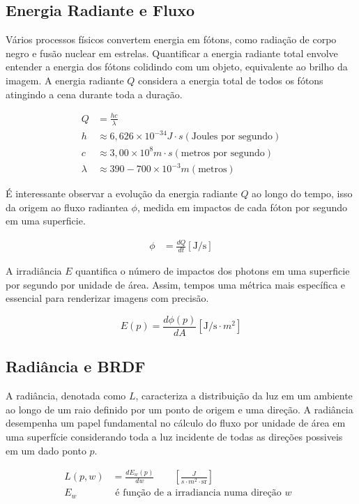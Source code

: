 \documentclass[english, 
               brazil, 
               bsc] %
               {dcomp-abntex2}
\begin{document}
\subsection{Energia Radiante e Fluxo}

Vários processos físicos convertem energia em fótons, como radiação de corpo negro e fusão nuclear em estrelas. Quantificar a energia radiante total envolve entender a energia dos fótons colidindo com um objeto, equivalente ao brilho da imagem. A energia radiante $Q$ considera a energia total de todos os fótons atingindo a cena durante toda a duração.

\begin{align*} 
Q &= \frac{hc}{\lambda} \\
  h &\approx 6,626 \times 10^{-34} J \cdot s (\text{Joules por segundo})\\
  c &\approx 3,00  \times 10^{8} m \cdot s (\text{metros por segundo})\\
  \lambda &\approx 390-700  \times 10^{-3} m (\text{metros})
\end{align*}


É interessante observar a evolução da energia radiante $Q$ ao longo do tempo, isso da origem ao fluxo radiantea $\phi$, medida em impactos de cada fóton por segundo em uma superficie.

\begin{align*} 
  \phi &= \frac{dQ}{dt} [\text{J/s}] 
\end{align*}

A irradiância $E$ quantifica o número de impactos dos photons em uma superficie por segundo por unidade de área. Assim, tempos uma métrica mais específica e essencial para renderizar imagens com precisão.

$$
 E(p) = \frac{d\phi(p)}{dA} [\text{J/s} \cdot m^2]
$$


\subsection{Radiância e BRDF}

A radiância, denotada como $L$, caracteriza a distribuição da luz em um ambiente ao longo de um raio definido por um ponto de origem e uma direção. A radiância desempenha um papel fundamental no cálculo do fluxo por unidade de área em uma superfície considerando toda a luz incidente de todas as direções possiveis em um dado ponto $p$.


\begin{align*} 
  L(p,w) &= \frac{dE_w(p)}{dw} \qquad \left[\frac{J}{s\cdot m^2\cdot \text{sr}}\right]\\ 
E_w &\text{ é função de a irradiancia numa direção $w$ }  \end{align*}
\end{document}
